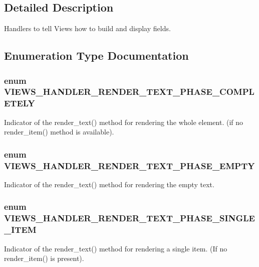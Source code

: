 \subsection{Detailed Description}
Handlers to tell Views how to build and display fields. 

\subsection{Enumeration Type Documentation}
\hypertarget{group__views__field__handlers_ga9e79d8dea50ce8dff131afa22ecfac41}{
\subsubsection[{VIEWS\_\-HANDLER\_\-RENDER\_\-TEXT\_\-PHASE\_\-COMPLETELY}]{\setlength{\rightskip}{0pt plus 5cm}enum {\bf VIEWS\_\-HANDLER\_\-RENDER\_\-TEXT\_\-PHASE\_\-COMPLETELY}}}
\label{group__views__field__handlers_ga9e79d8dea50ce8dff131afa22ecfac41}
Indicator of the render\_\-text() method for rendering the whole element. (if no render\_\-item() method is available). \hypertarget{group__views__field__handlers_ga0a388e031abd2ce00c90925a940235c9}{
\subsubsection[{VIEWS\_\-HANDLER\_\-RENDER\_\-TEXT\_\-PHASE\_\-EMPTY}]{\setlength{\rightskip}{0pt plus 5cm}enum {\bf VIEWS\_\-HANDLER\_\-RENDER\_\-TEXT\_\-PHASE\_\-EMPTY}}}
\label{group__views__field__handlers_ga0a388e031abd2ce00c90925a940235c9}
Indicator of the render\_\-text() method for rendering the empty text. \hypertarget{group__views__field__handlers_gaa1014f79648c5c78750110efa0437397}{
\subsubsection[{VIEWS\_\-HANDLER\_\-RENDER\_\-TEXT\_\-PHASE\_\-SINGLE\_\-ITEM}]{\setlength{\rightskip}{0pt plus 5cm}enum {\bf VIEWS\_\-HANDLER\_\-RENDER\_\-TEXT\_\-PHASE\_\-SINGLE\_\-ITEM}}}
\label{group__views__field__handlers_gaa1014f79648c5c78750110efa0437397}
Indicator of the render\_\-text() method for rendering a single item. (If no render\_\-item() is present). 